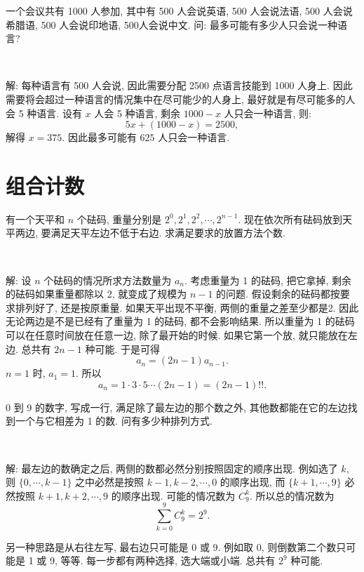 \newpage

一个会议共有 1000 人参加, 其中有 500 人会说英语, 500 人会说法语, 500 人会说希腊语, 500 人会说印地语, 500人会说中文. 问: 最多可能有多少人只会说一种语言?

~

解: 每种语言有 500 人会说, 因此需要分配 2500 点语言技能到 1000 人身上. 因此需要将会超过一种语言的情况集中在尽可能少的人身上, 最好就是有尽可能多的人会 5 种语言. 设有 $x$ 人会 5 种语言, 剩余 $1000-x$ 人只会一种语言, 则:
$$ 5x + (1000-x) = 2500 ,$$
解得 $x = 375$. 因此最多可能有 $625$ 人只会一种语言.

\newpage
\section{组合计数}

有一个天平和 $n$ 个砝码, 重量分别是 $2^0, 2^1, 2^2, \cdots, 2^{n-1}$. 现在依次所有砝码放到天平两边, 要满足天平左边不低于右边. 求满足要求的放置方法个数.

~

解: 设 $n$ 个砝码的情况所求方法数量为 $a_n$. 考虑重量为 1 的砝码, 把它拿掉, 剩余的砝码如果重量都除以 2, 就变成了规模为 $n-1$ 的问题. 假设剩余的砝码都按要求排列好了, 还是按原重量. 如果天平出现不平衡, 两侧的重量之差至少都是2. 因此无论两边是不是已经有了重量为 1 的砝码, 都不会影响结果. 所以重量为 1 的砝码可以在任意时间放在任意一边, 除了最开始的时候. 如果它第一个放, 就只能放在左边. 总共有 $2n-1$ 种可能. 
于是可得
\[ a_n = (2n-1)a_{n-1}. \]
$n=1$ 时, $a_1 = 1$. 所以 
$$a_n = 1\cdot 3\cdot 5\cdots (2n-1) = (2n-1)!! .$$

\newpage
0 到 9 的数字, 写成一行, 满足除了最左边的那个数之外, 其他数都能在它的左边找到一个与它相差为 1 的数. 问有多少种排列方式.

~

解: 最左边的数确定之后, 两侧的数都必然分别按照固定的顺序出现.
例如选了 $k$, 则 $\{0,\cdots,k-1\}$ 之中必然是按照 $k-1,k-2,\cdots,0$ 的顺序出现, 而 $\{k+1,\cdots,9\}$ 必然按照 $k+1,k+2,\cdots,9$ 的顺序出现. 可能的情况数为 $C_9^{k}$. 所以总的情况数为
\[\sum_{k=0}^9{C_9^{k}} = 2^9 .\]

另一种思路是从右往左写, 最右边只可能是 0 或 9. 例如取 0, 则倒数第二个数只可能是 1 或 9, 等等. 每一步都有两种选择, 选大端或小端. 总共有 $2^9$ 种可能.

